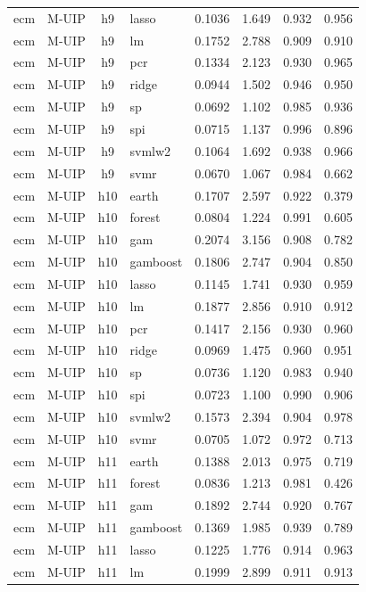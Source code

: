 \begin{ThreePartTable}
\begin{longtable}[t]{llclcccc}
ecm & M-UIP & h9 & lasso & 0.1036 & 1.649 & 0.932 & 0.956\\
ecm & M-UIP & h9 & lm & 0.1752 & 2.788 & 0.909 & 0.910\\
ecm & M-UIP & h9 & pcr & 0.1334 & 2.123 & 0.930 & 0.965\\
ecm & M-UIP & h9 & ridge & 0.0944 & 1.502 & 0.946 & 0.950\\
ecm & M-UIP & h9 & sp & 0.0692 & 1.102 & 0.985 & 0.936\\
ecm & M-UIP & h9 & spi & 0.0715 & 1.137 & 0.996 & 0.896\\
ecm & M-UIP & h9 & svmlw2 & 0.1064 & 1.692 & 0.938 & 0.966\\
ecm & M-UIP & h9 & svmr & 0.0670 & 1.067 & 0.984 & 0.662\\
\addlinespace
ecm & M-UIP & h10 & earth & 0.1707 & 2.597 & 0.922 & 0.379\\
ecm & M-UIP & h10 & forest & 0.0804 & 1.224 & 0.991 & 0.605\\
ecm & M-UIP & h10 & gam & 0.2074 & 3.156 & 0.908 & 0.782\\
ecm & M-UIP & h10 & gamboost & 0.1806 & 2.747 & 0.904 & 0.850\\
ecm & M-UIP & h10 & lasso & 0.1145 & 1.741 & 0.930 & 0.959\\
ecm & M-UIP & h10 & lm & 0.1877 & 2.856 & 0.910 & 0.912\\
ecm & M-UIP & h10 & pcr & 0.1417 & 2.156 & 0.930 & 0.960\\
ecm & M-UIP & h10 & ridge & 0.0969 & 1.475 & 0.960 & 0.951\\
ecm & M-UIP & h10 & sp & 0.0736 & 1.120 & 0.983 & 0.940\\
ecm & M-UIP & h10 & spi & 0.0723 & 1.100 & 0.990 & 0.906\\
ecm & M-UIP & h10 & svmlw2 & 0.1573 & 2.394 & 0.904 & 0.978\\
ecm & M-UIP & h10 & svmr & 0.0705 & 1.072 & 0.972 & 0.713\\
\addlinespace
ecm & M-UIP & h11 & earth & 0.1388 & 2.013 & 0.975 & 0.719\\
ecm & M-UIP & h11 & forest & 0.0836 & 1.213 & 0.981 & 0.426\\
ecm & M-UIP & h11 & gam & 0.1892 & 2.744 & 0.920 & 0.767\\
ecm & M-UIP & h11 & gamboost & 0.1369 & 1.985 & 0.939 & 0.789\\
ecm & M-UIP & h11 & lasso & 0.1225 & 1.776 & 0.914 & 0.963\\
ecm & M-UIP & h11 & lm & 0.1999 & 2.899 & 0.911 & 0.913\\

\end{longtable}
\end{ThreePartTable}
